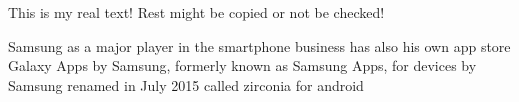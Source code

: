 This is my real text! Rest might be copied or not be checked!

Samsung as a major player in the smartphone business has also his own app store \cite{comscoreMarket}
Galaxy Apps by Samsung, formerly known as Samsung Apps, for devices by Samsung
renamed in July 2015
called zirconia for android
\cite{samsungZirconia}
%
